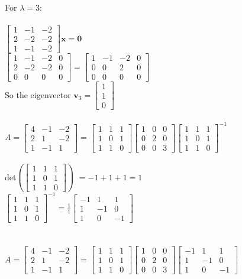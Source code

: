 \documentclass{article}
\newcommand{\newVect}[3]{\begin{bmatrix}#1 \\ #2 \\ #3\end{bmatrix}}
\newcommand{\newttt}[9]{\begin{bmatrix}#1 & #2 & #3\\ #4 & #5 & #6 \\ #7 & #8 & #9\end{bmatrix}}
\begin{document}
\begin{enumerate}
\begin{enumerate}
    For $\lambda = 3$:\\\\
    $\newttt{1}{-1}{-2}{2}{-2}{-2}{1}{-1}{-2}\textbf{x} = \textbf{0}$\\
    $\begin{bmatrix}
    1&-1&-2&0\\
    2&-2&-2&0\\
    0&0&0&0
    \end{bmatrix} = 
    \begin{bmatrix}
    1&-1&-2&0\\
    0&0&2&0\\
    0&0&0&0
    \end{bmatrix}$\\
    So the eigenvector $\textbf{v}_3 = \newVect{1}{1}{0}$\\\\
    
    $A = \newttt{4}{-1}{-2}{2}{1}{-2}{1}{-1}{1}=\newttt{1}{1}{1}{1}{0}{1}{1}{1}{0}
    \newttt{1}{0}{0}{0}{2}{0}{0}{0}{3}\newttt{1}{1}{1}{1}{0}{1}{1}{1}{0}^{-1}$\\\\
    det$\left(\newttt{1}{1}{1}{1}{0}{1}{1}{1}{0}\right)$ $= -1+1+1=1$\\
    $\newttt{1}{1}{1}{1}{0}{1}{1}{1}{0}^{-1} = \frac{1}{1}\newttt{-1}{1}{1}{1}{-1}{0}{1}{0}{-1}$\\\\\\
    $A = \newttt{4}{-1}{-2}{2}{1}{-2}{1}{-1}{1}=\newttt{1}{1}{1}{1}{0}{1}{1}{1}{0}
    \newttt{1}{0}{0}{0}{2}{0}{0}{0}{3}\newttt{-1}{1}{1}{1}{-1}{0}{1}{0}{-1}$\\\\
\end{enumerate}
\par
\newpage


\end{enumerate}
\end{document}
